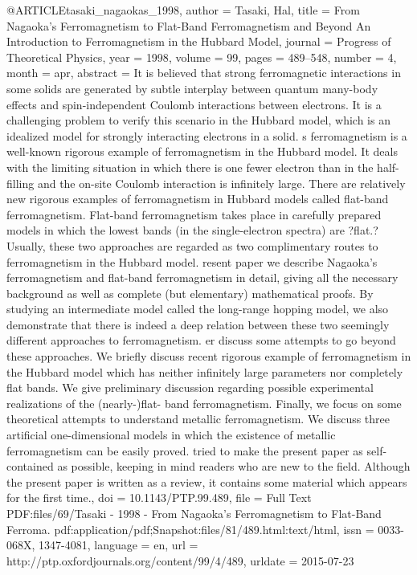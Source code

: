 @ARTICLE{tasaki_nagaokas_1998,
  author = {Tasaki, Hal},
  title = {From {Nagaoka}'s {Ferromagnetism} to {Flat}-{Band} {Ferromagnetism}
	and {Beyond} {An} {Introduction} to {Ferromagnetism} in the {Hubbard}
	{Model}},
  journal = {Progress of Theoretical Physics},
  year = {1998},
  volume = {99},
  pages = {489--548},
  number = {4},
  month = apr,
  abstract = {It is believed that strong ferromagnetic interactions in some solids
	are generated by subtle interplay between quantum many-body effects
	and spin-independent Coulomb interactions between electrons. It is
	a challenging problem to verify this scenario in the Hubbard model,
	which is an idealized model for strongly interacting electrons in
	a solid. s ferromagnetism is a well-known rigorous example of ferromagnetism
	in the Hubbard model. It deals with the limiting situation in which
	there is one fewer electron than in the half-filling and the on-site
	Coulomb interaction is infinitely large. There are relatively new
	rigorous examples of ferromagnetism in Hubbard models called flat-band
	ferromagnetism. Flat-band ferromagnetism takes place in carefully
	prepared models in which the lowest bands (in the single-electron
	spectra) are ?flat.? Usually, these two approaches are regarded as
	two complimentary routes to ferromagnetism in the Hubbard model.
	resent paper we describe Nagaoka's ferromagnetism and flat-band ferromagnetism
	in detail, giving all the necessary background as well as complete
	(but elementary) mathematical proofs. By studying an intermediate
	model called the long-range hopping model, we also demonstrate that
	there is indeed a deep relation between these two seemingly different
	approaches to ferromagnetism. er discuss some attempts to go beyond
	these approaches. We briefly discuss recent rigorous example of ferromagnetism
	in the Hubbard model which has neither infinitely large parameters
	nor completely flat bands. We give preliminary discussion regarding
	possible experimental realizations of the (nearly-)flat- band ferromagnetism.
	Finally, we focus on some theoretical attempts to understand metallic
	ferromagnetism. We discuss three artificial one-dimensional models
	in which the existence of metallic ferromagnetism can be easily proved.
	tried to make the present paper as self-contained as possible, keeping
	in mind readers who are new to the field. Although the present paper
	is written as a review, it contains some material which appears for
	the first time.},
  doi = {10.1143/PTP.99.489},
  file = {Full Text PDF:files/69/Tasaki - 1998 - From Nagaoka's Ferromagnetism to Flat-Band Ferroma.  pdf:application/pdf;Snapshot:files/81/489.html:text/html},
  issn = {0033-068X, 1347-4081},
  language = {en},
  url = {http://ptp.oxfordjournals.org/content/99/4/489},
  urldate = {2015-07-23}
}

